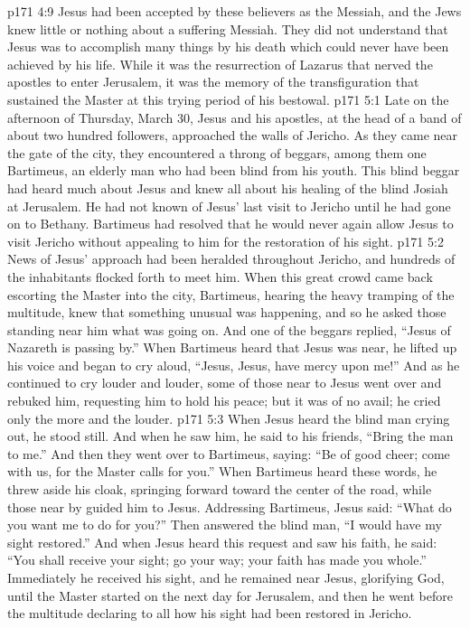 \vs p171 4:9 Jesus had been accepted by these believers as the Messiah, and the Jews knew little or nothing about a suffering Messiah. They did not understand that Jesus was to accomplish many things by his death which could never have been achieved by his life. While it was the resurrection of Lazarus that nerved the apostles to enter Jerusalem, it was the memory of the transfiguration that sustained the Master at this trying period of his bestowal.
\vs p171 5:1 Late on the afternoon of Thursday, March 30, Jesus and his apostles, at the head of a band of about two hundred followers, approached the walls of Jericho. As they came near the gate of the city, they encountered a throng of beggars, among them one Bartimeus, an elderly man who had been blind from his youth. This blind beggar had heard much about Jesus and knew all about his healing of the blind Josiah at Jerusalem. He had not known of Jesus’ last visit to Jericho until he had gone on to Bethany. Bartimeus had resolved that he would never again allow Jesus to visit Jericho without appealing to him for the restoration of his sight.
\vs p171 5:2 News of Jesus’ approach had been heralded throughout Jericho, and hundreds of the inhabitants flocked forth to meet him. When this great crowd came back escorting the Master into the city, Bartimeus, hearing the heavy tramping of the multitude, knew that something unusual was happening, and so he asked those standing near him what was going on. And one of the beggars replied, “Jesus of Nazareth is passing by.” When Bartimeus heard that Jesus was near, he lifted up his voice and began to cry aloud, “Jesus, Jesus, have mercy upon me!” And as he continued to cry louder and louder, some of those near to Jesus went over and rebuked him, requesting him to hold his peace; but it was of no avail; he cried only the more and the louder.
\vs p171 5:3 When Jesus heard the blind man crying out, he stood still. And when he saw him, he said to his friends, \textcolor{ubdarkred}{“Bring the man to me.”} And then they went over to Bartimeus, saying: “Be of good cheer; come with us, for the Master calls for you.” When Bartimeus heard these words, he threw aside his cloak, springing forward toward the center of the road, while those near by guided him to Jesus. Addressing Bartimeus, Jesus said: \textcolor{ubdarkred}{“What do you want me to do for you?”} Then answered the blind man, “I would have my sight restored.” And when Jesus heard this request and saw his faith, he said: \textcolor{ubdarkred}{“You shall receive your sight; go your way; your faith has made you whole.”} Immediately he received his sight, and he remained near Jesus, glorifying God, until the Master started on the next day for Jerusalem, and then he went before the multitude declaring to all how his sight had been restored in Jericho.
